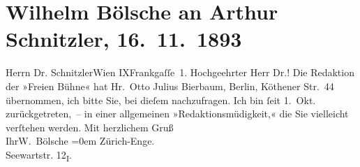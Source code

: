 

         
         \newcommand{\erwaehntePersonen}{Personen: Otto Julius Bierbaum}
         \newcommand{\erwaehnteInstitutionen}{}
         \newcommand{\erwaehnteOrte}{Orte: Enge, Frankgasse, IX., Alsergrund, Köthenerstraße, Seewartstraße, Wien, Zürich}
         \newcommand{\erwaehnteWerke}{Werke: Freie Bühne für den Entwickelungskampf der Zeit}
               \section[Wilhelm Bölsche an Arthur Schnitzler, 16. 11. 1893]{ Wilhelm Bölsche an Arthur Schnitzler, 16. 11. 1893}\nopagebreak{}\rehead{ }\begin{ledgroupsized}[t]{13cm}\normalsize\beginnumbering \toendnotes[C]{\smallbreak\pagebreak[2]} 
\pstart{}{\pb}Herrn Dr. Schnitzler\pend{}\pstart{}Wien IX\pend{}\pstart{}Frankgaſſe 1. \pend{}{\bigskip}\pstart{}{\pb}Hochgeehrter Herr Dr.!\pend\pstart
           Die Redaktion der »Freien Bühne« hat Hr. Otto Julius Bierbaum, Berlin, Köthener Str. 44 übernommen, ich bitte Sie, bei
                    dieſem nachzufragen. Ich bin ſeit 1. Okt. zurückgetreten, – in
                    einer allgemeinen »Redaktionsmüdigkeit,« die Sie vielleicht verſtehen
                    werden.\pend
           \pstart
           Mit herzlichem Gruß{\\[\baselineskip]}Ihr\spacefill\mbox{W. Bölsche}\pend
           \leftskip=0em{}\pstart
           \noindent{}Zürich-Enge.{\\}Seewartstr. 12\textsubscript{I}.\pend
           
         
         \endnumbering{}\end{ledgroupsized}  \newcommand{\dateiname}{L00284}\newcommand{\titel}{Wilhelm Bölsche an Arthur Schnitzler, 16. 11. 1893}\newcommand{\editorInnen}{Martin Anton Müller und Gerd-Hermann Susen}
      